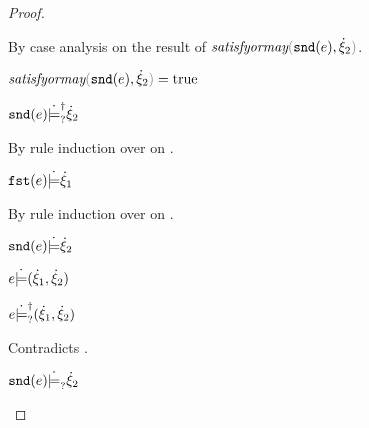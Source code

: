 \begin{proof}
\begin{byCases}
\begin{byCases}
\begin{byCases}
\begin{byCases}
          By case analysis on the result of $\fsatisfyormay{\hsnd{e}}{\hxi_2}$.
          \begin{byCases}
            \item[\true]
            \begin{pfsteps*}
            \item $\fsatisfyormay{\hsnd{e}}{\hxi_2}=\true$  
            \item $\mathtt{snd}(e) \dot{\models}_{?}^{\dag} \dot{\xi}_2$  
            \end{pfsteps*}  
            By rule induction over  on .
            \begin{byCases}
              \item[\text{(\ref{rule:CSMSSat})}]
              \begin{pfsteps*}
              \item $\mathtt{fst}(e) \dot{\models} \dot{\xi}_1$  
              \end{pfsteps*} 
              By rule induction over  on .
              \begin{byCases}
                \item[\text{(\ref{rule:CSMSSat})}]
                \begin{pfsteps*}
                \item $\mathtt{snd}(e) \dot{\models} \dot{\xi}_2$  
                \item $e \dot{\models} (\dot{\xi}_1 , \dot{\xi}_2)$  
                \item $e \dot{\models}_{?}^{\dag} (\dot{\xi}_1 , \dot{\xi}_2)$ 
                \end{pfsteps*} 
                Contradicts .
                \item[\text{(\ref{rule:CSMSMay})}]
                \begin{pfsteps*}
                \item $\mathtt{snd}(e) \dot{\models}_{?} \dot{\xi}_2$  

\end{pfsteps*}
\end{byCases}
\end{byCases}
\end{byCases}
\end{byCases}
\end{byCases}
\end{byCases}
\end{byCases}
\end{proof}
